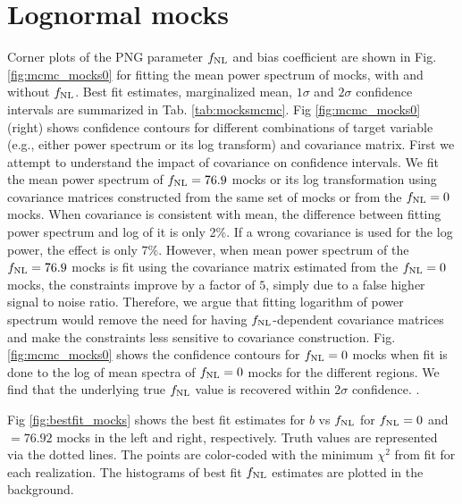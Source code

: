 \section{Lognormal mocks}
Corner plots of the PNG parameter $f_{\rm NL}$ and bias coefficient are shown in Fig. \ref{fig:mcmc_mocks0} for fitting the mean power spectrum of mocks, with and without $f_{\rm NL}$. Best fit estimates, marginalized mean, $1\sigma$ and $2\sigma$ confidence intervals are summarized in Tab. \ref{tab:mocksmcmc}. Fig \ref{fig:mcmc_mocks0} (right) shows confidence contours for different combinations of target variable (e.g., either power spectrum or its log transform) and covariance matrix. First we attempt to understand the impact of covariance on confidence intervals. We fit the mean power spectrum of $f_{\rm NL}=76.9$ mocks or its log transformation using covariance matrices constructed from the same set of mocks or from the $f_{\rm NL}=0$ mocks. When covariance is consistent with mean, the difference between fitting power spectrum and log of it is only 2\%. If a wrong covariance is used for the log power, the effect is only $7\%$. However, when mean power spectrum of the $f_{\rm NL}=76.9$ mocks is fit using the covariance matrix estimated from the $f_{\rm NL}=0$ mocks, the constraints improve by a factor of $5$, simply due to a false higher signal to noise ratio. Therefore, we argue that fitting logarithm of power spectrum would remove the need for having $f_{\rm NL}$-dependent covariance matrices and make the constraints less sensitive to covariance construction. Fig. \ref{fig:mcmc_mocks0} shows the confidence contours for $f_{\rm NL}=0$ mocks when fit is done to the log of mean spectra of $f_{\rm NL}=0$ mocks for the different regions. We find that the underlying true $f_{\rm NL}$ value is recovered within $2\sigma$ confidence. .

Fig \ref{fig:bestfit_mocks} shows the best fit estimates for $b$ vs $f_{\rm NL}$ for $f_{\rm NL}=0$ and $=76.92$ mocks in the left and right, respectively. Truth values are represented via the dotted lines. The points are color-coded with the minimum $\chi^{2}$ from fit for each realization. The histograms of best fit $f_{\rm NL}$ estimates are plotted in the background.

